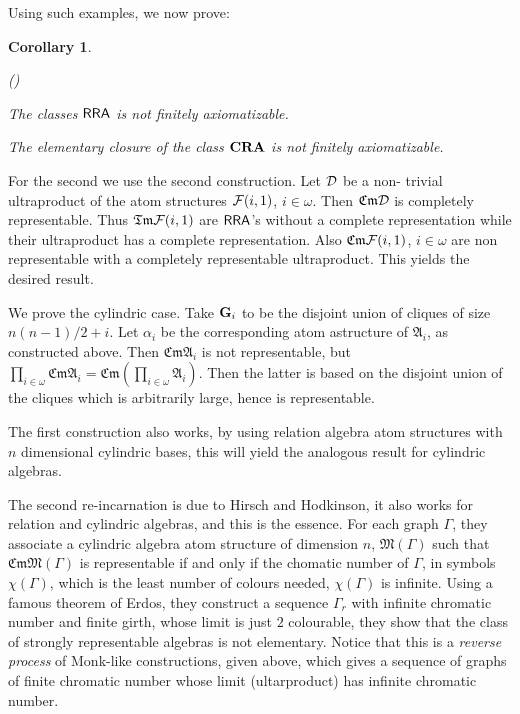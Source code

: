 \documentclass[12pt]{article}
\newcounter{item}[section]
\newcounter{kirshb}
\newenvironment{enumarab}{\setcounter{kirshb}{1}
\begin{list}{(\arabic{kirshb})}{\usecounter{kirshb}} }{\end{list}}
\newtheorem{corollary}[theorem]{Corollary}
\newenvironment{demo}[1]{\noindent{\bf #1.}\upshape\mdseries}
{\nopagebreak{\hfill\rule{2mm}{2mm}\nopagebreak}\par\normalfont}
\theoremstyle{definition}
\def\A{{\mathfrak{A}}}
\def\M{{\mathfrak{M}}}
\def\RRA{{\bf RRA}}
\def\G{{\sf G}}
\def\Cm{{\mathfrak{Cm}}}
\def\Tm{{\mathfrak{Tm}}}
\def\A{{\mathfrak{A}}}
\def\A{{\mathfrak{A}}}
\def\RRA{{\sf RRA}}
\def\G{{\bf G}}
\begin{document}
Using such examples, we now prove:
\begin{corollary}
\begin{enumarab}
\item  The classes $\RRA$ is not finitely axiomatizable.
\item  The elementary
closure of the class ${\bf CRA}$ is not finitely axiomatizable.
\end{enumarab}
\end{corollary}
\begin{demo}{Proof}
For the second  we use the second construction.  Let ${\cal D}$ be a non-
trivial ultraproduct of the atom structures ${\cal F}(i,1)$, $i\in \omega$. Then $\Cm{\cal D}$
is completely representable. 
Thus $\Tm{\cal F}(i,1)$ are $\RRA$'s 
without a complete representation while their ultraproduct has a complete representation.
Also $\Cm{\cal F}(i,1)$, $i\in \omega$ 
are non representable with a completely representable ultraproduct.
This yields the desired result.

We prove the cylindric case. Take $\G_i$ to be the disjoint union of cliques of size $n(n-1)/2+i$. 
Let $\alpha_i$ be the corresponding atom astructure
of $\A_i$, as constructed above. Then $\Cm \A_i$ is not representable, but $\prod_{i\in \omega}\Cm\A_i=\Cm(\prod_{i\in \omega}\A_i)$. 
Then the latter is based on the disjoint union of the cliques which is arbitrarily large, hence is representable. 
\end{demo}
The first construction also works, by using relation algebra atom structures with $n$ dimensional cylindric bases, this will
yield the analogous result for cylindric algebras.

The second re-incarnation is due to Hirsch and Hodkinson, it also works for relation and cylindric algebras, and this is the essence. For each graph
$\Gamma$, they associate a cylindric algebra atom structure of dimension $n$, $\M(\Gamma)$ such that $\Cm\M(\Gamma)$ is representable
if and only if the chomatic number of $\Gamma$, in symbols $\chi(\Gamma)$, which is the least number of colours needed, $\chi(\Gamma)$ is infinite. 
Using a famous theorem of Erdos, they construct  a sequence $\Gamma_r$ with infinite chromatic number and finite girth, 
whose limit is just $2$ colourable, they show that the class of strongly representable
algebras  is not elementary. Notice that this is a {\it reverse process} of Monk-like  constructions, given above, 
which gives a sequence of graphs of finite chromatic number whose limit (ultarproduct) has infinite
chromatic number.
\end{document}
